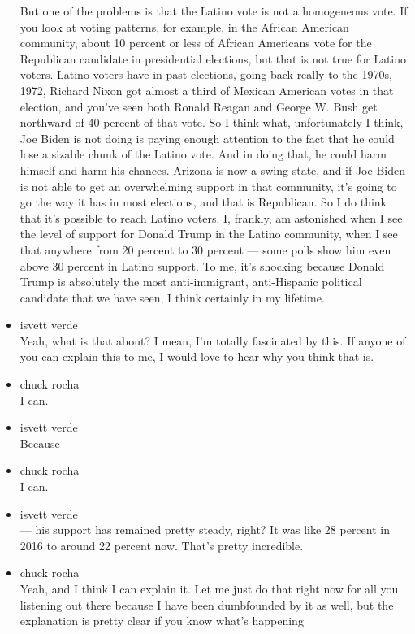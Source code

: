\begin{itemize}
  But one of the problems is that the Latino vote is not a homogeneous
  vote. If you look at voting patterns, for example, in the African
  American community, about 10 percent or less of African Americans vote
  for the Republican candidate in presidential elections, but that is
  not true for Latino voters. Latino voters have in past elections,
  going back really to the 1970s, 1972, Richard Nixon got almost a third
  of Mexican American votes in that election, and you've seen both
  Ronald Reagan and George W. Bush get northward of 40 percent of that
  vote. So I think what, unfortunately I think, Joe Biden is not doing
  is paying enough attention to the fact that he could lose a sizable
  chunk of the Latino vote. And in doing that, he could harm himself and
  harm his chances. Arizona is now a swing state, and if Joe Biden is
  not able to get an overwhelming support in that community, it's going
  to go the way it has in most elections, and that is Republican. So I
  do think that it's possible to reach Latino voters. I, frankly, am
  astonished when I see the level of support for Donald Trump in the
  Latino community, when I see that anywhere from 20 percent to 30
  percent --- some polls show him even above 30 percent in Latino
  support. To me, it's shocking because Donald Trump is absolutely the
  most anti-immigrant, anti-Hispanic political candidate that we have
  seen, I think certainly in my lifetime.
\item
  isvett verde\\
  Yeah, what is that about? I mean, I'm totally fascinated by this. If
  anyone of you can explain this to me, I would love to hear why you
  think that is.
\item
  chuck rocha\\
  I can.
\item
  isvett verde\\
  Because ---
\item
  chuck rocha\\
  I can.
\item
  isvett verde\\
  --- his support has remained pretty steady, right? It was like 28
  percent in 2016 to around 22 percent now. That's pretty incredible.
\item
  chuck rocha\\
  Yeah, and I think I can explain it. Let me just do that right now for
  all you listening out there because I have been dumbfounded by it as
  well, but the explanation is pretty clear if you know what's happening

\end{itemize}
